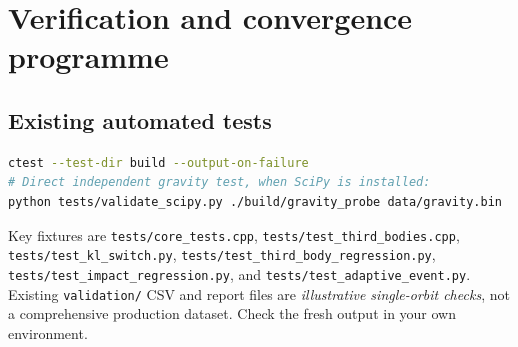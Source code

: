 \documentclass[11pt,a4paper]{article}
\newcommand{\pathcode}[1]{\nolinkurl{#1}}
\newcommand{\kbd}[1]{\texttt{\detokenize{#1}}}
\begin{document}
\section{Verification and convergence programme}
\label{sec:validation}
\subsection{Existing automated tests}
\begin{lstlisting}[language=bash]
ctest --test-dir build --output-on-failure
# Direct independent gravity test, when SciPy is installed:
python tests/validate_scipy.py ./build/gravity_probe data/gravity.bin
\end{lstlisting}
Key fixtures are \pathcode{tests/core_tests.cpp}, \pathcode{tests/test_third_bodies.cpp}, \pathcode{tests/test_kl_switch.py}, \pathcode{tests/test_third_body_regression.py}, \pathcode{tests/test_impact_regression.py}, and \pathcode{tests/test_adaptive_event.py}. Existing \pathcode{validation/} CSV and report files are \emph{illustrative single-orbit checks}, not a comprehensive production dataset. Check the fresh \kbd{ctest} output in your own environment.
\end{document}
